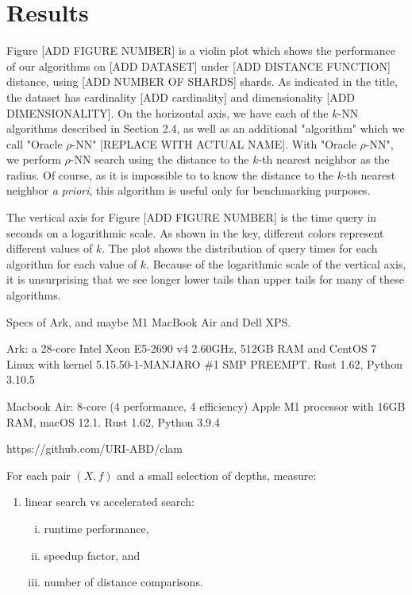 \section{Results}
\label{sec:results}


Figure [ADD FIGURE NUMBER] is a violin plot which shows the performance of our algorithms
on [ADD DATASET] under [ADD DISTANCE FUNCTION] distance, using [ADD NUMBER OF SHARDS] shards.
As indicated in the title, the dataset has cardinality [ADD cardinality] and dimensionality [ADD DIMENSIONALITY].
On the horizontal axis, we have each of the $k$-NN algorithms described in Section 2.4, as well as  
an additional "algorithm" which we call "Oracle $\rho$-NN" [REPLACE WITH ACTUAL NAME].  With "Oracle $\rho$-NN", we perform $\rho$-NN search using the 
distance to the $k$-th nearest neighbor as the radius. Of course, as it is impossible to
to know the distance to the $k$-th nearest neighbor \emph{a priori}, this algorithm 
is useful only for benchmarking purposes.

The vertical axis for Figure [ADD FIGURE NUMBER] is the time query in seconds on a logarithmic scale. 
As shown in the key, different colors represent different values of $k$. 
The plot shows the distribution of query times for each algorithm for each value of $k$. 
Because of the logarithmic scale of the vertical axis, it is unsurprising that we 
see longer lower tails than upper tails for many of these algorithms. 

Specs of Ark, and maybe M1 MacBook Air and Dell XPS.

Ark: a 28-core Intel Xeon E5-2690 v4 2.60GHz, 512GB RAM and CentOS 7 Linux with kernel 5.15.50-1-MANJARO \#1 SMP PREEMPT. Rust 1.62, Python 3.10.5

Macbook Air: 8-core (4 performance, 4 efficiency) Apple M1 processor with 16GB RAM, macOS 12.1. Rust 1.62, Python 3.9.4

https://github.com/URI-ABD/clam

For each pair $(X, f)$ and a small selection of depths, measure:
\begin{enumerate}[1.]
    \item linear search vs accelerated search:
    \begin{enumerate}[i.]
        \item runtime performance,
        \item speedup factor, and
        \item number of distance comparisons.
    \end{enumerate}
\end{enumerate}

